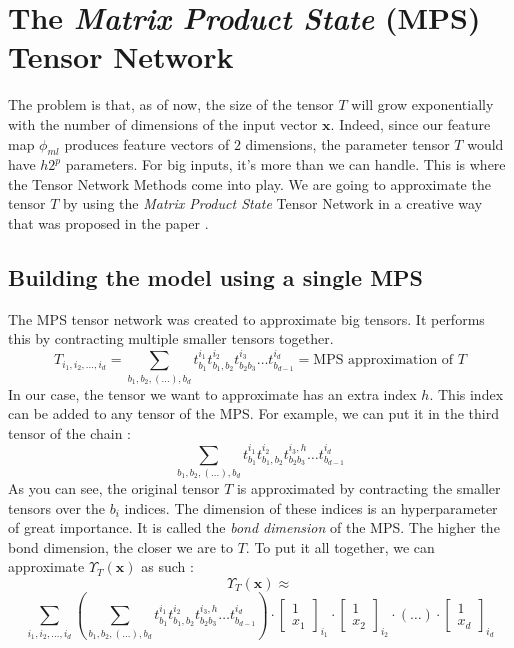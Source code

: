 \documentclass{article}
\theoremstyle{definition}
\theoremstyle{definition}
\begin{document}
\section{The \emph{Matrix Product State} (MPS) Tensor Network}
The problem is that, as of now, the size of the tensor $T$ will grow exponentially with the number of dimensions of the input vector $\mathbf{x}$. Indeed, since our feature map $\phi_{ml}$ produces feature vectors of $2$ dimensions, the parameter tensor $T$ would have $h2^p$ parameters. For big inputs, it's more than we can handle. This is where the Tensor Network Methods come into play. We are going to approximate the tensor $T$ by using the \emph{Matrix Product State} Tensor Network in a creative way that was proposed in the paper \cite{stoudenmire2017supervised}.
\subsection{Building the model using a single MPS}
The MPS tensor network was created to approximate big tensors. It performs this by contracting multiple smaller tensors together.
\begin{equation} \label{eq:mps_approx}
T_{i_1, i_2, \dots, i_d} 
= 
\sum_{b_1,b_2,(\dots), b_d} t^{i_1}_{b_1} t^{i_2}_{b_1, b_2} t^{i_3}_{b_2 b_3} \dots  t^{i_d}_{ b_{d-1} } 
= \text{MPS approximation of $T$}
\end{equation}
In our case, the tensor we want to approximate has an extra index $h$. This index can be added to any tensor of the MPS. For example, we can put it in the third tensor of the chain :
\[
    \sum_{b_1,b_2,(\dots), b_d} t^{i_1}_{b_1} t^{i_2}_{b_1, b_2} t^{i_3, h}_{b_2 b_3} \dots  t^{i_d}_{ b_{d-1} } 
\]
As you can see, the original tensor $T$ is approximated by contracting the smaller tensors over the $b_i$ indices. The dimension of these indices is an hyperparameter of great importance. It is called the \emph{bond dimension} of the MPS. The higher the bond dimension, the closer we are to $T$. To put it all together, we can approximate $\Upsilon_T(\mathbf{x})$ as such :
\[
    \Upsilon_T(\mathbf{x}) \approx
\]
\[
    \sum_{i_1, i_2, \dots, i_d}
    \left(
    \sum_{b_1,b_2,(\dots), b_d} t^{i_1}_{b_1} t^{i_2}_{b_1, b_2} t^{i_3, h}_{b_2 b_3} \dots  t^{i_d}_{ b_{d-1} } 
    \right)
    \cdot
    \begin{bmatrix}
        1 \\ x_1
    \end{bmatrix}_{i_1}
    \cdot
    \begin{bmatrix}
        1 \\ x_2
    \end{bmatrix}_{i_2}
    \cdot
    (\dots)
    \cdot
    \begin{bmatrix}
        1 \\ x_d
    \end{bmatrix}_{i_d}
\]
\end{document}

